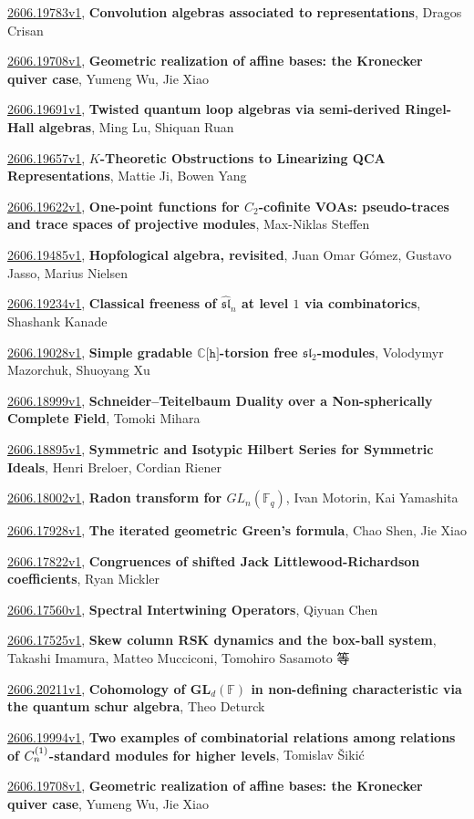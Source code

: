 \documentclass[9pt, a4paper]{article}
\theoremstyle{plain}
\theoremstyle{definition}
\theoremstyle{remark}
\newcommand{\arxiv}[3]{\href{https://arxiv.org/abs/#1}{#1}, \textbf{\textcolor{arxivblue}{#2}}, #3}
\begin{document}
\arxiv{2606.19783v1}{Convolution algebras associated to representations}{Dragos Crisan}

\arxiv{2606.19708v1}{Geometric realization of affine bases: the Kronecker quiver case}{Yumeng Wu, Jie Xiao}

\arxiv{2606.19691v1}{Twisted quantum loop algebras via semi-derived Ringel-Hall algebras}{Ming Lu, Shiquan Ruan}

\arxiv{2606.19657v1}{$K$-Theoretic Obstructions to Linearizing QCA Representations}{Mattie Ji, Bowen Yang}

\arxiv{2606.19622v1}{One-point functions for $C_2$-cofinite VOAs: pseudo-traces and trace spaces of projective modules}{Max-Niklas Steffen}

\arxiv{2606.19485v1}{Hopfological algebra, revisited}{Juan Omar Gómez, Gustavo Jasso, Marius Nielsen}

\arxiv{2606.19234v1}{Classical freeness of $\widehat{\mathfrak{sl}}_n$ at level $1$ via combinatorics}{Shashank Kanade}

\arxiv{2606.19028v1}{Simple gradable $\mathbb{C}\lbrack\mathtt{h}\rbrack$-torsion free $\mathfrak{sl}_2$-modules}{Volodymyr Mazorchuk, Shuoyang Xu}

\arxiv{2606.18999v1}{Schneider--Teitelbaum Duality over a Non-spherically Complete Field}{Tomoki Mihara}

\arxiv{2606.18895v1}{Symmetric and Isotypic Hilbert Series for Symmetric Ideals}{Henri Breloer, Cordian Riener}

\arxiv{2606.18002v1}{Radon transform for $GL_n(\mathbb{F}_q)$}{Ivan Motorin, Kai Yamashita}

\arxiv{2606.17928v1}{The iterated geometric Green's formula}{Chao Shen, Jie Xiao}

\arxiv{2606.17822v1}{Congruences of shifted Jack Littlewood-Richardson coefficients}{Ryan Mickler}

\arxiv{2606.17560v1}{Spectral Intertwining Operators}{Qiyuan Chen}

\arxiv{2606.17525v1}{Skew column RSK dynamics and the box-ball system}{Takashi Imamura, Matteo Mucciconi, Tomohiro Sasamoto 等}

\arxiv{2606.20211v1}{Cohomology of $\mathbf{GL}_d(\mathbb{F})$ in non-defining characteristic via the quantum schur algebra}{Theo Deturck}

\arxiv{2606.19994v1}{Two examples of combinatorial relations among relations of $C_{n}\sp{(1)}$-standard modules for higher levels}{Tomislav Šiki\' c}

\arxiv{2606.19708v1}{Geometric realization of affine bases: the Kronecker quiver case}{Yumeng Wu, Jie Xiao}
\end{document}
